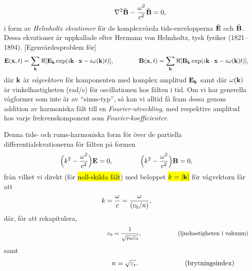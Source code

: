 {{{{{{$$    \qquad\qquad
    \nabla^2\tilde{\bf B} - {{\omega^2}\over{c^2}}\tilde{\bf B} = 0,
  $$
  i form av {\it Helmholtz ekvationer} f{\"o}r de komplexv{\"a}rda
  tids-envelopperna $\tilde{\bf E}$ och $\tilde{\bf B}$. Dessa ekvationer
  {\"a}r uppkallade efter Hermann von Helmholtz, tysk fysiker (1821--1894).
  [Egenv{\"a}rdesproblem f{\"o}r]}
\hl{$$
  {\bf E}({\bf x},t)=\sum_{\bf k}
     \Re[{\bf E}_{\bf k}\exp(i{\bf k}\cdot{\bf x}-i\omega({\bf k}) t)],
  \qquad\qquad
  {\bf B}({\bf x},t)=\sum_{\bf k}
     \Re[{\bf B}_{\bf k}\exp(i{\bf k}\cdot{\bf x}-i\omega({\bf k}) t)],
$$}
d{\"a}r ${\bf k}$ {\"a}r {\it v{\aa}gvektorn} f{\"o}r komponenten med komplex
amplitud ${\bf E}_{\bf k}$ samt d{\"a}r $\omega({\bf k})$ {\"a}r
vinkelhastigheten (rad/s) f{\"o}r oscillationen hos f{\"a}lten i tid.
Om vi har generella v{\aa}gformer som inte {\"a}r av ``sinus-typ'', s{\aa} kan
vi alltid f{\aa} fram dessa genom addition av harmoniska f{\"a}lt till en
{\it Fourier-utveckling}, med respektive amplitud hos varje frekvenskomponent
som {\it Fourier-koefficienter}.
\vfill\eject

Denna tids- och rums-harmoniska form f{\"o}r {\"o}ver de partiella
differentialekvationerna f{\"o}r f{\"a}lten p{\aa}
formen
\hl{$$
  \Big(k^2 - {{\omega^2}\over{c^2}}\Big) {\bf E} = 0,
  \qquad\qquad
  \Big(k^2 - {{\omega^2}\over{c^2}}\Big) {\bf B} = 0,
$$}
fr{\aa}n vilket vi direkt (f{\"o}r {\hl{noll-skilda f{\"a}lt}}) med beloppet
{\hl{$k=|{\bf k}|$}} f{\"o}r v{\aa}gvektorn f{\aa}r att
\hl{$$
  k = {{\omega}\over{c}}
    = {{\omega}\over{(c_0/n)}},
$$}
d{\"a}r, f{\"o}r att rekapitulera,
$$
  \hskip100pt\hphantom{ljushastigheten}
  c_0 = {{1}\over{\sqrt{\mu_0\varepsilon_0}}},
  \hskip60pt(\hbox{ljushastigheten i vakuum})
$$
samt
$$
  \hskip69pt\hphantom{brytningsindex}
  n = \sqrt{\varepsilon_{\rm r}}.
  \hskip69pt(\hbox{brytningsindex})
$$

}}}}}
